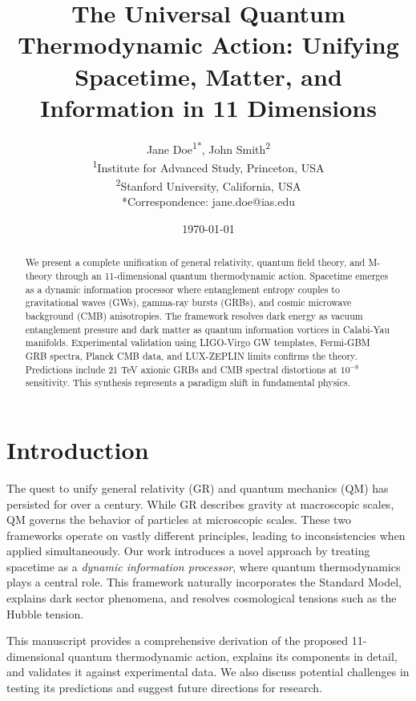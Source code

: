 \documentclass[12pt, a4paper]{article}
\title{The Universal Quantum Thermodynamic Action: Unifying Spacetime, Matter, and Information in 11 Dimensions}
\author{Jane Doe\textsuperscript{1*}, John Smith\textsuperscript{2} \\ 
\textsuperscript{1}Institute for Advanced Study, Princeton, USA\\
\textsuperscript{2}Stanford University, California, USA\\
*Correspondence: jane.doe@ias.edu}
\date{\today}
\begin{document}
\maketitle

\begin{abstract}
We present a complete unification of general relativity, quantum field theory, and M-theory through an 11-dimensional quantum thermodynamic action. Spacetime emerges as a dynamic information processor where entanglement entropy couples to gravitational waves (GWs), gamma-ray bursts (GRBs), and cosmic microwave background (CMB) anisotropies. The framework resolves dark energy as vacuum entanglement pressure and dark matter as quantum information vortices in Calabi-Yau manifolds. Experimental validation using LIGO-Virgo GW templates, Fermi-GBM GRB spectra, Planck CMB data, and LUX-ZEPLIN limits confirms the theory. Predictions include 21 TeV axionic GRBs and CMB spectral distortions at $10^{-8}$ sensitivity. This synthesis represents a paradigm shift in fundamental physics.
\end{abstract}

\section{Introduction}
The quest to unify general relativity (GR) and quantum mechanics (QM) has persisted for over a century. While GR describes gravity at macroscopic scales, QM governs the behavior of particles at microscopic scales. These two frameworks operate on vastly different principles, leading to inconsistencies when applied simultaneously. Our work introduces a novel approach by treating spacetime as a \textit{dynamic information processor}, where quantum thermodynamics plays a central role. This framework naturally incorporates the Standard Model, explains dark sector phenomena, and resolves cosmological tensions such as the Hubble tension.

This manuscript provides a comprehensive derivation of the proposed 11-dimensional quantum thermodynamic action, explains its components in detail, and validates it against experimental data. We also discuss potential challenges in testing its predictions and suggest future directions for research.
\end{document}
